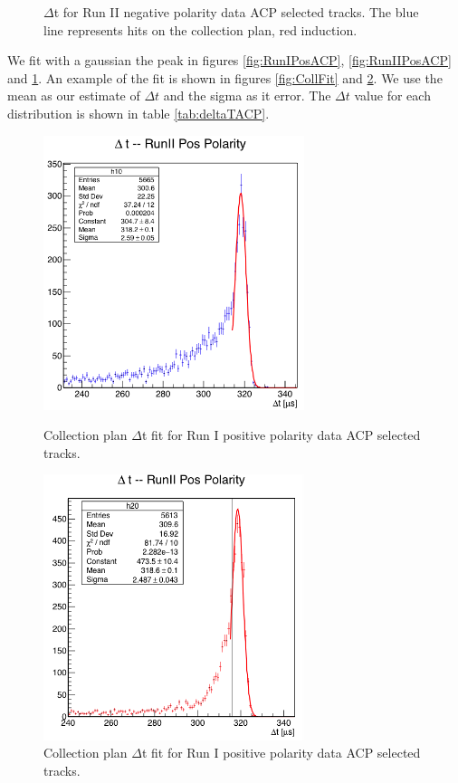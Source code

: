 \begin{figure}[]
\begin{minipage}{0.45\textwidth}
\caption{$\Delta$t for Run II negative polarity data ACP selected tracks.  The blue line represents hits on the collection plan, red induction.}
\label{fig:RunIINegACP}
\end{minipage}
\end{figure}

We fit with a gaussian the peak in figures  \ref{fig:RunIPosACP}, \ref{fig:RunIIPosACP} and \ref{fig:RunIINegACP}. An example of the fit is shown in figures \ref{fig:CollFit} and \ref{fig:IndFit}. We use the mean as our estimate of $\Delta t$ and the sigma as it error. The $\Delta t$ value for each distribution is shown in table \ref{tab:deltaTACP}.
\begin{figure}[]
\centering
\begin{minipage}{0.45\textwidth}
\centering
\includegraphics[width=3in]{images/CollectionFitRunIIPos.png}
\caption{Collection plan $\Delta$t fit  for Run I positive polarity data ACP selected tracks. }
\label{fig:CollFit}
\end{minipage}\hfill
\begin{minipage}{0.45\textwidth}
\centering
\includegraphics[width=3in]{images/InductionFitRunIIPos.png}
\caption{Collection plan $\Delta$t fit  for Run I positive polarity data ACP selected tracks. }
\label{fig:IndFit}
\end{minipage}
\end{figure}

